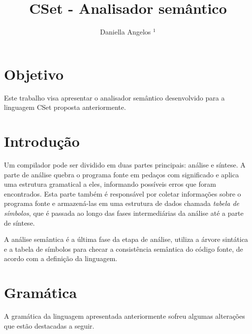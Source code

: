 \documentclass[12pt]{article}
\title{CSet - Analisador semântico}
\author{Daniella Angelos $^1$}
\begin{document}
 

\maketitle

\section{Objetivo}
Este trabalho visa apresentar o analisador semântico desenvolvido para a linguagem CSet proposta anteriormente.

\section{Introdução}

Um compilador pode ser dividido em duas partes principais: análise e síntese. A parte de análise quebra o programa fonte em pedaços com significado e aplica uma estrutura gramatical a eles, informando possíveis erros que foram encontrados. Esta parte também é responsável por coletar informações sobre o programa fonte e armazená-las em uma estrutura de dados chamada \textit{tabela de símbolos}, que é passada ao longo das fases intermediárias da análise até a parte de síntese.

A análise semântica é a última fase da etapa de análise, utiliza a árvore sintática e a tabela de símbolos para checar a consistência semântica do código fonte, de acordo com a definição da linguagem.

\section{Gramática}

A gramática da linguagem apresentada anteriormente sofreu algumas alterações que estão destacadas a seguir.
\end{document}
